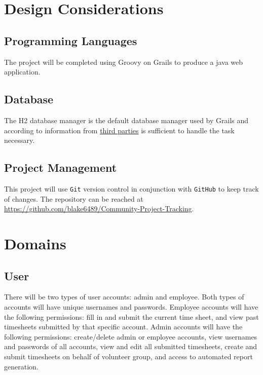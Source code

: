 \documentclass[12pt]{article}
\newcommand{\e}[1] {{\tt #1}}
\begin{document}
\section{Design Considerations}

\subsection{Programming Languages}
The project will be completed using Groovy on Grails to produce a java web application. 

\subsection{Database}
The H2 database manager is the default database manager used by Grails and according to information from \href{http://database-management-systems.findthebest.com/compare/16-30/H2-vs-MySQL}{third parties} is sufficient to handle the task necessary.

\subsection{Project Management}
This project will use \e{Git} version control in conjunction with \e{GitHub} to keep track of changes. The repository can be reached at \url{https://github.com/blake6489/Community-Project-Tracking}.

\section{Domains}\label{sec:Domains}
\subsection{User}\label{sec:DUser}
There will be two types of user accounts: admin and employee. Both types of accounts will have unique usernames and passwords. Employee accounts will have the following permissions: fill in and submit the current time sheet, and view past timesheets submitted by that specific account. Admin accounts will have the following permissions: create/delete admin or employee accounts, view usernames and passwords of all accounts, view and edit all submitted timesheets, create and submit timesheets on behalf of volunteer group, and access to automated report generation.

\setcounter{paragraph}{0}
\end{document}
